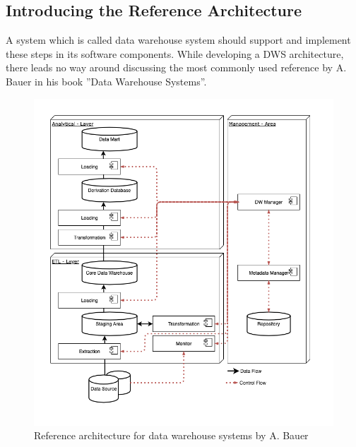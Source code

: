 \subsection{Introducing the Reference Architecture}
A system which is called data warehouse system should support and implement these steps in its software components. While developing a DWS architecture, there leads no way around discussing the most commonly used reference by A. Bauer in his book ''Data Warehouse Systems''.\cite{dwsRefArchitecture}\newline
\begin{figure}[htb]
    \centering
    \includegraphics[scale=0.5]{pictures/InmonHubSpoke.png}
    \caption{Reference architecture for data warehouse systems by A. Bauer \cite[p.~42]{dwsRefArchitecture}}
    \label{fig:referenceArchitecture}
\end{figure} 

